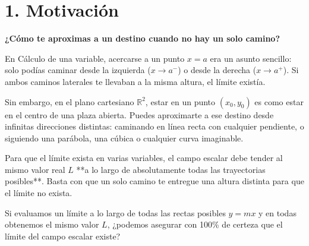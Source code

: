\documentclass[11pt]{article}
\newenvironment{motivacion}{%
  \section*{1. Motivación}%
}{}
\newenvironment{preguntaguia}{%
  \begin{tcolorbox}[colback=cyan!5,colframe=cyan!75!black,title=Pregunta Guía]%
}{%
  \end{tcolorbox}%
}
\begin{document}
\begin{motivacion}
  \textbf{¿Cómo te aproximas a un destino cuando no hay un solo camino?}

  En Cálculo de una variable, acercarse a un punto $x = a$ era un asunto sencillo: solo podías caminar desde la izquierda ($x \to a^-$) o desde la derecha ($x \to a^+$). Si ambos caminos laterales te llevaban a la misma altura, el límite existía.

  Sin embargo, en el plano cartesiano $\mathbb{R}^2$, estar en un punto $(x_0, y_0)$ es como estar en el centro de una plaza abierta. Puedes aproximarte a ese destino desde infinitas direcciones distintas: caminando en línea recta con cualquier pendiente, o siguiendo una parábola, una cúbica o cualquier curva imaginable.

  Para que el límite exista en varias variables, el campo escalar debe tender al mismo valor real $L$ **a lo largo de absolutamente todas las trayectorias posibles**. Basta con que un solo camino te entregue una altura distinta para que el límite no exista.

  \begin{preguntaguia}
    Si evaluamos un límite a lo largo de todas las rectas posibles $y = mx$ y en todas obtenemos el mismo valor $L$, ¿podemos asegurar con 100\% de certeza que el límite del campo escalar existe?
  \end{preguntaguia}
\end{motivacion}
\end{document}
